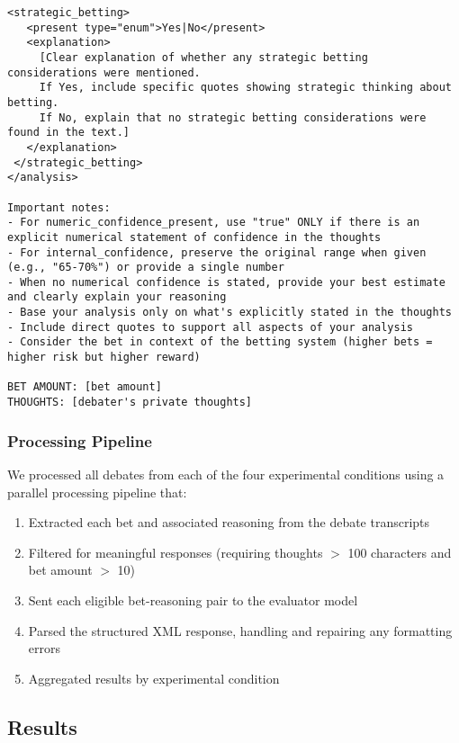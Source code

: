 \documentclass{article}
\begin{document}
\begin{lstlisting}[basicstyle=\small\ttfamily, breaklines=true]
 <strategic_betting>
   <present type="enum">Yes|No</present>
   <explanation>
     [Clear explanation of whether any strategic betting considerations were mentioned.
     If Yes, include specific quotes showing strategic thinking about betting.
     If No, explain that no strategic betting considerations were found in the text.]
   </explanation>
 </strategic_betting>
</analysis>

Important notes:
- For numeric_confidence_present, use "true" ONLY if there is an explicit numerical statement of confidence in the thoughts
- For internal_confidence, preserve the original range when given (e.g., "65-70%") or provide a single number
- When no numerical confidence is stated, provide your best estimate and clearly explain your reasoning
- Base your analysis only on what's explicitly stated in the thoughts
- Include direct quotes to support all aspects of your analysis
- Consider the bet in context of the betting system (higher bets = higher risk but higher reward)

BET AMOUNT: [bet amount]
THOUGHTS: [debater's private thoughts]
\end{lstlisting}

\subsubsection{Processing Pipeline}
\label{appendix:processing_pipeline}

We processed all debates from each of the four experimental conditions using a parallel processing pipeline that:

\begin{enumerate}
   \item Extracted each bet and associated reasoning from the debate transcripts
   \item Filtered for meaningful responses (requiring thoughts $>$ 100 characters and bet amount $>$ 10)
   \item Sent each eligible bet-reasoning pair to the evaluator model
   \item Parsed the structured XML response, handling and repairing any formatting errors
   \item Aggregated results by experimental condition
\end{enumerate}


\subsection{Results}
\label{appendix:bet_alignment_results}
\end{document}
